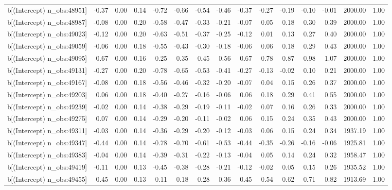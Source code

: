 \begin{table}[ht]
\begin{tabular}{rrrrrrrrrrrrrrr}
  b[(Intercept) n\_obs:48951] & -0.37 & 0.00 & 0.14 & -0.72 & -0.66 & -0.54 & -0.46 & -0.37 & -0.27 & -0.19 & -0.10 & -0.01 & 2000.00 & 1.00 \\ 
  b[(Intercept) n\_obs:48987] & -0.08 & 0.00 & 0.20 & -0.58 & -0.47 & -0.33 & -0.21 & -0.07 & 0.05 & 0.18 & 0.30 & 0.39 & 2000.00 & 1.00 \\ 
  b[(Intercept) n\_obs:49023] & -0.12 & 0.00 & 0.20 & -0.63 & -0.51 & -0.37 & -0.25 & -0.12 & 0.01 & 0.13 & 0.27 & 0.40 & 2000.00 & 1.00 \\ 
  b[(Intercept) n\_obs:49059] & -0.06 & 0.00 & 0.18 & -0.55 & -0.43 & -0.30 & -0.18 & -0.06 & 0.06 & 0.18 & 0.29 & 0.43 & 2000.00 & 1.00 \\ 
  b[(Intercept) n\_obs:49095] & 0.67 & 0.00 & 0.16 & 0.25 & 0.35 & 0.45 & 0.56 & 0.67 & 0.78 & 0.87 & 0.98 & 1.07 & 2000.00 & 1.00 \\ 
  b[(Intercept) n\_obs:49131] & -0.27 & 0.00 & 0.20 & -0.78 & -0.65 & -0.53 & -0.41 & -0.27 & -0.13 & -0.02 & 0.10 & 0.21 & 2000.00 & 1.00 \\ 
  b[(Intercept) n\_obs:49167] & -0.08 & 0.00 & 0.18 & -0.56 & -0.46 & -0.32 & -0.20 & -0.07 & 0.04 & 0.15 & 0.26 & 0.37 & 2000.00 & 1.00 \\ 
  b[(Intercept) n\_obs:49203] & 0.06 & 0.00 & 0.18 & -0.40 & -0.27 & -0.16 & -0.06 & 0.06 & 0.18 & 0.29 & 0.41 & 0.55 & 2000.00 & 1.00 \\ 
  b[(Intercept) n\_obs:49239] & -0.02 & 0.00 & 0.14 & -0.38 & -0.29 & -0.19 & -0.11 & -0.02 & 0.07 & 0.16 & 0.26 & 0.33 & 2000.00 & 1.00 \\ 
  b[(Intercept) n\_obs:49275] & 0.07 & 0.00 & 0.14 & -0.29 & -0.20 & -0.11 & -0.02 & 0.06 & 0.15 & 0.24 & 0.35 & 0.43 & 2000.00 & 1.00 \\ 
  b[(Intercept) n\_obs:49311] & -0.03 & 0.00 & 0.14 & -0.36 & -0.29 & -0.20 & -0.12 & -0.03 & 0.06 & 0.15 & 0.24 & 0.34 & 1937.19 & 1.00 \\ 
  b[(Intercept) n\_obs:49347] & -0.44 & 0.00 & 0.14 & -0.78 & -0.70 & -0.61 & -0.53 & -0.44 & -0.35 & -0.26 & -0.16 & -0.06 & 1925.81 & 1.00 \\ 
  b[(Intercept) n\_obs:49383] & -0.04 & 0.00 & 0.14 & -0.39 & -0.31 & -0.22 & -0.13 & -0.04 & 0.05 & 0.14 & 0.24 & 0.32 & 1958.47 & 1.00 \\ 
  b[(Intercept) n\_obs:49419] & -0.11 & 0.00 & 0.13 & -0.45 & -0.38 & -0.28 & -0.21 & -0.12 & -0.02 & 0.05 & 0.15 & 0.26 & 1935.52 & 1.00 \\ 
  b[(Intercept) n\_obs:49455] & 0.45 & 0.00 & 0.13 & 0.11 & 0.18 & 0.28 & 0.36 & 0.45 & 0.54 & 0.62 & 0.71 & 0.82 & 1913.69 & 1.00 \\ 

\end{tabular}
\end{table}

